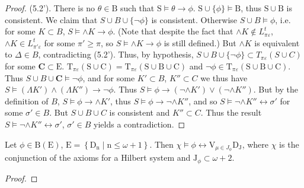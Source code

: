 \documentclass{article}
\begin{document}
{{{\begin{proof}
(5.2'). There is no $\theta \in \mathrm{B}$ such that $\mathrm{S} \vDash \theta \rightarrow \phi$. $\mathrm{S} \cup \{\phi\} \vDash \mathrm{B}$, thus $\mathrm{S} \cup \mathrm{B}$ is consistent. We claim that $S \cup B \cup \{\neg \phi\}$ is consistent. Otherwise $S \cup B \vDash \phi$, i.e. for some $K \subset B$, $S \vDash \wedge K \rightarrow \phi$. (Note that despite the fact that $\wedge K \notin L_{\pi \varepsilon}^{t}$, $\wedge K \in L_{\pi' \varepsilon}^{t}$ for some $\pi' \geq \pi$, so $S \vDash \wedge K \rightarrow \phi$ is still defined.) But $\wedge K$ is equivalent to $\Delta \in B$, contradicting (5.2'). Thus, by hypothesis, $S \cup B \cup \{\neg \phi\} \subset T_{\pi \varepsilon}(S \cup C)$ for some $\mathbf{C} \subset \mathrm{E}$. $\mathrm{T}_{\pi \varepsilon}(\mathrm{S} \cup \mathrm{C})=\mathrm{T}_{\pi \varepsilon}(\mathrm{S} \cup \mathrm{B} \cup \mathrm{C})$ and $\neg \phi \in \mathrm{T}_{\pi \varepsilon}(\mathrm{S} \cup \mathrm{B} \cup \mathrm{C})$. Thus $S \cup B \cup \mathbf{C} \vDash \neg \phi$, and for some $K' \subset B$, $K'' \subset C$ we thus have $S \vDash \left(\Lambda K'\right) \wedge \left(\Lambda K''\right) \rightarrow \neg \phi$. Thus $S \vDash \phi \rightarrow \left(\neg \wedge K'\right) \vee \left(\neg \wedge K''\right)$. But by the definition of $B$, $S \vDash \phi \rightarrow \wedge K'$, thus $S \vDash \phi \rightarrow \neg \wedge K''$, and so $S \vDash \neg \wedge K'' \leftrightarrow \sigma'$ for some $\sigma' \in B$. But $S \cup B \cup C$ is consistent and $K'' \subset C$. Thus the result $S \vDash \neg \wedge K'' \leftrightarrow \sigma'$, $\sigma' \in B$ yields a contradiction.
\end{proof}
\begin{lemma}
Let $\phi \in \mathrm{B}(\mathrm{E})$, $\mathrm{E}=\left\{\mathrm{D}_{\mathrm{n}} \mid \mathrm{n} \leq \omega+1\right\}$. Then $\chi \vDash \phi \leftrightarrow \mathrm{V}_{\mu \in J_{\phi}} \mathrm{D}_{\mathrm{J}}$, where $\chi$ is the conjunction of the axioms for a Hilbert system and $\mathrm{J}_{\phi} \subset \omega+2$.
\end{lemma}
\begin{proof}

\end{proof}}}}
\end{document}
